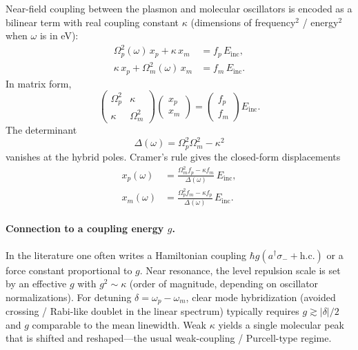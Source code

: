 \documentclass[11pt,a4paper]{article}
\begin{document}
Near-field coupling between the plasmon and molecular oscillators is
encoded as a bilinear term with real coupling constant $\kappa$
(dimensions of frequency$^2$ / energy$^2$ when $\omega$ is in eV):
\begin{align}
  \Omega_p^2(\omega)\, x_p + \kappa\, x_m
  &=
  f_p\, E_{\mathrm{inc}},
  \label{eq:coup-p} \\
  \kappa\, x_p + \Omega_m^2(\omega)\, x_m
  &=
  f_m\, E_{\mathrm{inc}}.
  \label{eq:coup-m}
\end{align}
In matrix form,
\begin{equation}
  \begin{pmatrix}
    \Omega_p^2 & \kappa \\
    \kappa & \Omega_m^2
  \end{pmatrix}
  \begin{pmatrix}
    x_p \\ x_m
  \end{pmatrix}
  =
  \begin{pmatrix}
    f_p \\ f_m
  \end{pmatrix}
  E_{\mathrm{inc}}.
  \label{eq:matrix}
\end{equation}
The determinant
\begin{equation}
  \Delta(\omega)
  =
  \Omega_p^2\Omega_m^2 - \kappa^2
  \label{eq:det}
\end{equation}
vanishes at the hybrid poles.  Cramer's rule gives the closed-form
displacements
\begin{align}
  x_p(\omega)
  &=
  \frac{
    \Omega_m^2 f_p - \kappa f_m
  }{
    \Delta(\omega)
  }\,
  E_{\mathrm{inc}},
  \label{eq:xp} \\[0.4em]
  x_m(\omega)
  &=
  \frac{
    \Omega_p^2 f_m - \kappa f_p
  }{
    \Delta(\omega)
  }\,
  E_{\mathrm{inc}}.
  \label{eq:xm}
\end{align}

\paragraph{Connection to a coupling energy $g$.}
In the literature one often writes a Hamiltonian coupling
$\hbar g(a^\dagger\sigma_- + \mathrm{h.c.})$ or a force constant
proportional to $g$.  Near resonance, the level repulsion scale is set
by an effective $g$ with $g^2 \sim \kappa$ (order of magnitude, depending
on oscillator normalizations).  For detuning
$\delta=\omega_p-\omega_m$, clear mode hybridization (avoided crossing /
Rabi-like doublet in the linear spectrum) typically requires
$g \gtrsim |\delta|/2$ and $g$ comparable to the mean linewidth.
Weak $\kappa$ yields a single molecular peak that is shifted and
reshaped---the usual weak-coupling / Purcell-type regime.
\end{document}
